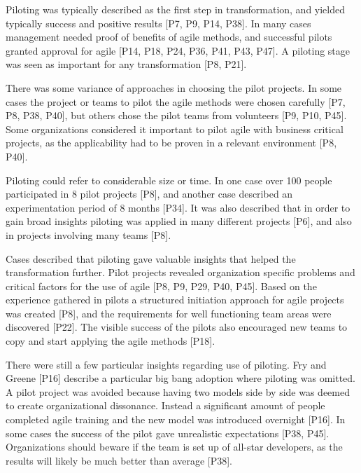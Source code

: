 \documentclass[preprint,authoryear,12pt]{elsarticle}
\begin{document}
Piloting was typically described as the first step in transformation, and
yielded typically success and positive results [P7, P9, P14, P38]. In many cases
management needed proof of benefits of agile methods, and successful pilots
granted approval for agile [P14, P18, P24, P36, P41, P43, P47].
A piloting stage was seen as important for any transformation [P8, P21].


There was some variance of approaches in choosing the pilot projects.
In some cases the project or teams to pilot the agile methods were chosen
carefully [P7, P8, P38, P40], but others chose the pilot teams from volunteers
[P9, P10, P45].
Some organizations considered it important to pilot agile with business critical
projects, as the applicability had to be proven in a relevant environment [P8,
P40].

Piloting could refer to considerable size or time. In one case over 100 people
participated in 8 pilot projects [P8], and another case described an
experimentation period of 8 months [P34].
It was also described that in order to gain broad insights piloting was applied
in many different projects [P6], and also in projects involving many teams [P8].

Cases described that piloting gave valuable insights that helped the
transformation further.
Pilot projects revealed organization specific problems and critical factors for
the use of agile [P8, P9, P29, P40, P45].
Based on the experience gathered in pilots a structured initiation approach for
agile projects was created [P8], and the requirements for well functioning team
areas were discovered [P22].
The visible success of the pilots also encouraged new teams to copy and start
applying the agile methods [P18].


There were still a few particular insights regarding use of piloting.
Fry and Greene [P16] describe a particular big bang adoption where piloting was
omitted. A pilot project was avoided because having two models side by side was
deemed to create organizational dissonance. Instead a significant amount of
people completed agile training and the new model was introduced overnight
[P16].
In some cases the success of the pilot gave unrealistic expectations [P38, P45].
Organizations should beware if the team is set up of all-star developers, as
the results will likely be much better than average [P38].
\end{document}
